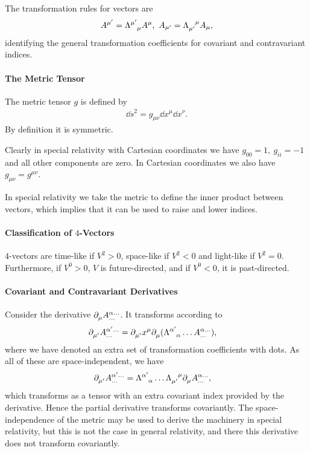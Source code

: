 The transformation rules for vectors are
\begin{align*}
	A^{\mu\p} = \trcou{\mu\p}{\mu}A^{\mu},\ A_{\mu\p} = \trcod{\mu\p}{\mu}A_{\mu},
\end{align*}
identifying the general transformation coefficients for covariant and contravariant indices.

\paragraph{The Metric Tensor}
The metric tensor $g$ is defined by
\begin{align*}
	\dd{s}^{2} = g_{\mu\nu}\dd{x^{\mu}}\dd{x^{\nu}}.
\end{align*}
By definition it is symmetric.

Clearly in special relativity with Cartesian coordinates we have $g_{00} = 1,\ g_{ii} = -1$ and all other components are zero. In Cartesian coordinates we also have $g_{\mu\nu} = g^{\mu\nu}$.

In special relativity we take the metric to define the inner product between vectors, which implies that it can be used to raise and lower indices.

\paragraph{Classification of $4$-Vectors}
$4$-vectors are time-like if $V^{2} > 0$, space-like if $V^{2} < 0$ and light-like if $V^{2} = 0$. Furthermore, if $V^{0} > 0$, $V$ is future-directed, and if $V^{0} < 0$, it is past-directed.

\paragraph{Covariant and Contravariant Derivatives}
Consider the derivative $\del{\mu}{\tensor*{A}{^{\alpha\dots}_{\dots}}}$. It transforms according to
\begin{align*}
	\del{\mu\p}{\tensor*{A}{^{\alpha\p\dots}_{\dots}}} &= \del{\mu\p}{x^{\mu}}\del{\mu}{(\trcou{\alpha\p}{\alpha}\dots\tensor*{A}{^{\alpha\dots}_{\dots}})},
\end{align*}
where we have denoted an extra set of transformation coefficients with dots. As all of these are space-independent, we have
\begin{align*}
	\del{\mu\p}{\tensor*{A}{^{\alpha\p\dots}_{\dots}}} &= \trcou{\alpha\p}{\alpha}\dots\trcod{\mu\p}{\mu}\del{\mu}{\tensor*{A}{^{\alpha\dots}_{\dots}}},
\end{align*}
which transforms as a tensor with an extra covariant index provided by the derivative. Hence the partial derivative transforms covariantly. The space-independence of the metric may be used to derive the machinery in special relativity, but this is not the case in general relativity, and there this derivative does not transform covariantly.

